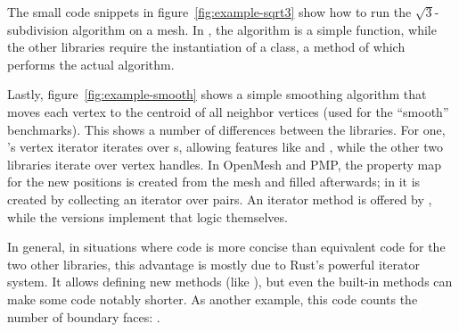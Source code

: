 The small code snippets in figure~\ref{fig:example-sqrt3} show how to run the $\sqrt{3}$-subdivision algorithm \cite{kobbelt20003} on a mesh.
In , the algorithm is a simple function, while the other libraries require the instantiation of a class, a method of which performs the actual algorithm.

Lastly, figure~\ref{fig:example-smooth} shows a simple smoothing algorithm that moves each vertex to the centroid of all neighbor vertices (used for the \enquote{smooth} benchmarks).
This shows a number of differences between the libraries.
For one, 's vertex iterator iterates over s, allowing features like  and , while the other two libraries iterate over vertex handles.
In OpenMesh and PMP, the property map for the new positions is created from the mesh and filled afterwards; in  it is created by collecting an iterator over  pairs.
An iterator method  is offered by , while the versions implement that logic themselves.

In general, in situations where  code is more concise than equivalent code for the two other libraries, this advantage is mostly due to Rust's powerful iterator system.
It allows defining new methods (like ), but even the built-in methods can make some code notably shorter.
As another example, this code counts the number of boundary faces: .


